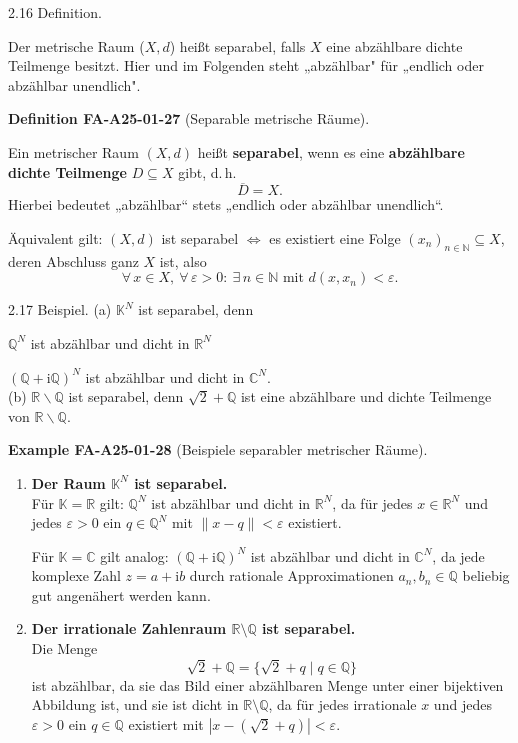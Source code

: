 \documentclass[10pt, letterpaper]{article}
\newcommand{\CustomHeading}[3]{%
  \par\medskip\noindent%
  \textbf{#1 #2} \textnormal{(#3)}.\enskip%
}
\newenvironment{DEF}[2]{\begin{unitbox}\CustomHeading{Definition}{#1}{#2}}{\end{unitbox}}
\newenvironment{EXA}[2]{\begin{unitbox}\CustomHeading{Example}{#1}{#2}}{\end{unitbox}}
\begin{document}
2.16 Definition. 

Der metrische Raum ($X,d$) heißt separabel, falls $X$ eine abzählbare dichte Teilmenge besitzt. Hier und im Folgenden steht „abzählbar" für „endlich oder abzählbar unendlich".


\begin{DEF}{FA-A25-01-27}{Separable metrische Räume}
Ein metrischer Raum $(X,d)$ heißt \textbf{separabel},  
wenn es eine \textbf{abzählbare dichte Teilmenge} $D\subseteq X$ gibt, d.\,h.
\[
\overline{D}=X.
\]
Hierbei bedeutet „abzählbar“ stets „endlich oder abzählbar unendlich“.  

Äquivalent gilt: $(X,d)$ ist separabel $\Longleftrightarrow$  
es existiert eine Folge $(x_n)_{n\in\mathbb{N}}\subseteq X$, deren Abschluss ganz $X$ ist, also  
\[
\forall\,x\in X,\ \forall\,\varepsilon>0:\ \exists\,n\in\mathbb{N}\text{ mit }d(x,x_n)<\varepsilon.
\]
\end{DEF}



2.17 Beispiel. (a) $\mathbb{K}^{N}$ ist separabel, denn
  
  $\mathbb{Q}^{N}$ ist abzählbar und dicht in $\mathbb{R}^{N}$
  
  $(\mathbb{Q}+\mathrm{i} \mathbb{Q})^{N}$ ist abzählbar und dicht in $\mathbb{C}^{N}$.\\

(b) $\mathbb{R} \backslash \mathbb{Q}$ ist separabel, denn $\sqrt{2}+\mathbb{Q}$ ist eine abzählbare und dichte Teilmenge von $\mathbb{R} \backslash \mathbb{Q}$.




\begin{EXA}{FA-A25-01-28}{Beispiele separabler metrischer Räume}
\begin{enumerate}
\item \textbf{Der Raum $\mathbb{K}^{N}$ ist separabel.}\\[0.3em]
Für $\mathbb{K}=\mathbb{R}$ gilt:  
$\mathbb{Q}^{N}$ ist abzählbar und dicht in $\mathbb{R}^{N}$, da für jedes $x\in\mathbb{R}^{N}$ und jedes $\varepsilon>0$ ein $q\in\mathbb{Q}^{N}$ mit $\|x-q\|<\varepsilon$ existiert.

Für $\mathbb{K}=\mathbb{C}$ gilt analog:  
$(\mathbb{Q}+\mathrm{i}\mathbb{Q})^{N}$ ist abzählbar und dicht in $\mathbb{C}^{N}$, da jede komplexe Zahl $z=a+\mathrm{i}b$ durch rationale Approximationen $a_n,b_n\in\mathbb{Q}$ beliebig gut angenähert werden kann.

\item \textbf{Der irrationale Zahlenraum $\mathbb{R}\setminus\mathbb{Q}$ ist separabel.}\\[0.3em]
Die Menge
\[
\sqrt{2}+\mathbb{Q}=\{\sqrt{2}+q\mid q\in\mathbb{Q}\}
\]
ist abzählbar, da sie das Bild einer abzählbaren Menge unter einer bijektiven Abbildung ist,  
und sie ist dicht in $\mathbb{R}\setminus\mathbb{Q}$, da für jedes irrationale $x$ und jedes $\varepsilon>0$ ein $q\in\mathbb{Q}$ existiert mit $|x-(\sqrt{2}+q)|<\varepsilon$.
\end{enumerate}
\end{EXA}
\end{document}

